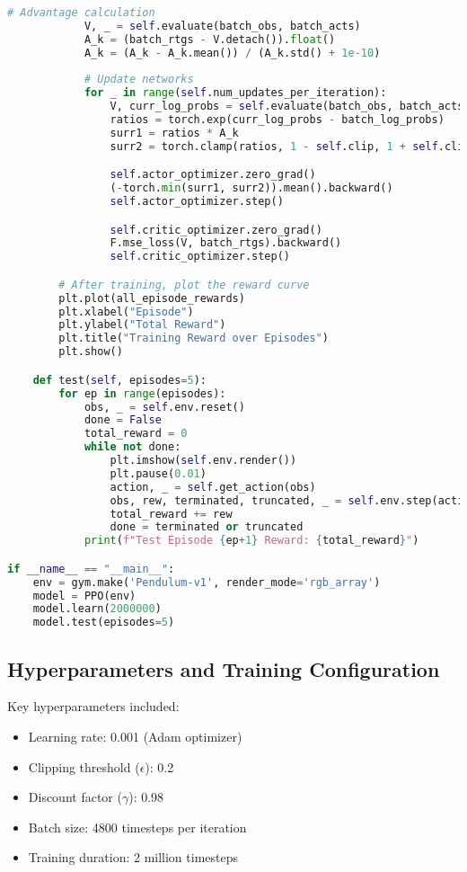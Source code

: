 \documentclass[12pt]{extreport} %
\begin{document}
\begin{lstlisting}[language=Python, caption={PPO Implementation (ppo.py)}, label={code:ppo}]
            # Advantage calculation
            V, _ = self.evaluate(batch_obs, batch_acts)
            A_k = (batch_rtgs - V.detach()).float()
            A_k = (A_k - A_k.mean()) / (A_k.std() + 1e-10)
            
            # Update networks
            for _ in range(self.num_updates_per_iteration):
                V, curr_log_probs = self.evaluate(batch_obs, batch_acts)
                ratios = torch.exp(curr_log_probs - batch_log_probs)
                surr1 = ratios * A_k
                surr2 = torch.clamp(ratios, 1 - self.clip, 1 + self.clip) * A_k

                self.actor_optimizer.zero_grad()
                (-torch.min(surr1, surr2)).mean().backward()
                self.actor_optimizer.step()

                self.critic_optimizer.zero_grad()
                F.mse_loss(V, batch_rtgs).backward()
                self.critic_optimizer.step()

        # After training, plot the reward curve
        plt.plot(all_episode_rewards)
        plt.xlabel("Episode")
        plt.ylabel("Total Reward")
        plt.title("Training Reward over Episodes")
        plt.show()

    def test(self, episodes=5):
        for ep in range(episodes):
            obs, _ = self.env.reset()
            done = False
            total_reward = 0
            while not done:
                plt.imshow(self.env.render())
                plt.pause(0.01)
                action, _ = self.get_action(obs)
                obs, rew, terminated, truncated, _ = self.env.step(action)
                total_reward += rew
                done = terminated or truncated
            print(f"Test Episode {ep+1} Reward: {total_reward}")

if __name__ == "__main__":
    env = gym.make('Pendulum-v1', render_mode='rgb_array')
    model = PPO(env)
    model.learn(2000000)
    model.test(episodes=5)
\end{lstlisting}

\subsection{\textbf{Hyperparameters and Training Configuration}}
Key hyperparameters included:
\begin{itemize}
    \item Learning rate: 0.001 (Adam optimizer)
    \item Clipping threshold ($\epsilon$): 0.2
    \item Discount factor ($\gamma$): 0.98
    \item Batch size: 4800 timesteps per iteration
    \item Training duration: 2 million timesteps
\end{itemize}
\end{document}

